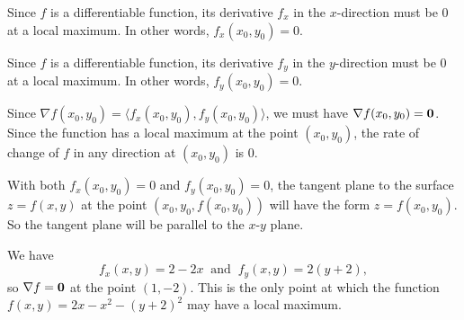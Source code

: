 \begin{activitySolution} 
   \ba 
  \item Since $f$ is a differentiable function, its derivative $f_x$ in the $x$-direction must be 0 at a local maximum. In other words, $f_x(x_0,y_0) = 0$. 
     
  \item Since $f$ is a differentiable function, its derivative $f_y$ in the $y$-direction must be 0 at a local maximum. In other words, $f_y(x_0,y_0) = 0$.
    
  \item Since $\nabla f(x_0,y_0) = \langle f_x(x_0,y_0), f_y(x_0,y_0) \rangle$, we must have $\nabla f(x_0,y_0) = \mathbf{0}$. Since the function has a local maximum at the point $(x_0,y_0)$, the rate of change of $f$ in any direction at $(x_0,y_0)$ is 0. 
    
  \item With both $f_x(x_0,y_0)=0$ and $f_y(x_0,y_0) = 0$, the tangent plane to the surface $z = f(x,y)$ at the point $(x_0, y_0, f(x_0,y_0))$ will have the form $z = f(x_0,y_0)$. So the tangent plane will be parallel to the $x$-$y$ plane. 
  
  \item We have 
\[f_x(x,y) = 2-2x \ \text{ and } \ f_y(x,y) = 2(y+2),\]
so $\nabla f = \mathbf{0}$ at the point $(1,-2)$. This is the only point at which the function $f(x,y) = 2x -   x^2 - (y + 2)^2$ may have a local maximum.
  \ea
\end{activitySolution}

\afterpa 